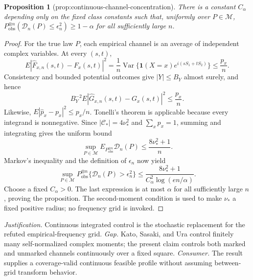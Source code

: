 \documentclass{article}
\newtheorem{proposition}{Proposition}
\begin{document}
\begin{proposition}[prop:continuous-channel-concentration]\label{prop:continuous-channel-concentration}
There is a constant \(C_{\alpha}\) depending only on the fixed class constants such that, uniformly over \(P\in\mathcal M\), \(P_{\mathrm{obs}}^{\otimes n}(\mathscr D_n(P)\le\epsilon_n^2)\ge1-\alpha\) for all sufficiently large \(n\).
\end{proposition}
\begin{proof}
For the true law \(P\), each empirical channel is an average of independent complex variables.  At every \((s,t)\),
\[
 E|\widehat F_{x,n}(s,t)-F_x(s,t)|^2
 =\frac1n\operatorname{Var}\{\mathbf 1(X=x)e^{i(sS_1+tS_2)}\}
 \le\frac{p_x}{n}.
\]
Consistency and bounded potential outcomes give \(|Y|\le B_Y\) almost surely, and hence
\[
 B_Y^{-2}E|\widehat G_{x,n}(s,t)-G_x(s,t)|^2\le\frac{p_x}{n}.
\]
Likewise, \(E|\widehat p_x-p_x|^2\le p_x/n\).  Tonelli's theorem is applicable because every integrand is nonnegative.  Since \(|\mathcal C_*|=4\nu_*^2\) and \(\sum_xp_x=1\), summing and integrating gives the uniform bound
\[
 \sup_{P\in\mathcal M}E_{P_{\mathrm{obs}}^{\otimes n}}\mathscr D_n(P)
 \le\frac{8\nu_*^2+1}{n}. \tag{22}
\]
Markov's inequality and the definition of \(\epsilon_n\) now yield
\[
 \sup_{P\in\mathcal M}P_{\mathrm{obs}}^{\otimes n}
 \{\mathscr D_n(P)>\epsilon_n^2\}
 \le\frac{8\nu_*^2+1}{C_\alpha^2\log(en/\alpha)}.
\]
Choose a fixed \(C_\alpha>0\).  The last expression is at most \(\alpha\) for all sufficiently large \(n\), proving the proposition.  The second-moment condition is used to make \(\nu_*\) a fixed positive radius; no frequency grid is invoked.
\end{proof}
\par\smallskip\noindent \textit{Justification.} Continuous integrated control is the stochastic replacement for the refuted empirical-frequency grid. \textit{Gap.} Kato, Sasaki, and Ura control finitely many self-normalized complex moments; the present claim controls both marked and unmarked channels continuously over a fixed square. \textit{Consumer.} The result supplies a coverage-valid continuous feasible profile without assuming between-grid transform behavior.
\end{document}
